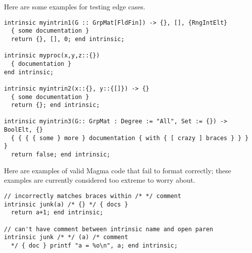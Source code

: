 \documentclass{article}
\begin{document}
Here are some examples for testing edge cases.

\begin{verbatim}
intrinsic myintrin1(G :: GrpMat[FldFin]) -> {}, [], {RngIntElt}
  { some documentation }
  return {}, [], 0; end intrinsic;

intrinsic myproc(x,y,z::{})
  { documentation }
end intrinsic;

intrinsic myintrin2(x::{}, y::{[]}) -> {}
  { some documentation }
  return {}; end intrinsic;

intrinsic myintrin3(G:: GrpMat : Degree := "All", Set := {}) -> BoolElt, {}
  { { { { some } more } documentation { with { [ crazy ] braces } } } }
  return false; end intrinsic;
\end{verbatim}

Here are examples of valid Magma code that fail to format correctly;
these examples are currently considered too extreme to worry about.

\begin{verbatim}
// incorrectly matches braces within /* */ comment
intrinsic junk(a) /* {} */ { docs }
  return a+1; end intrinsic;

// can't have comment between intrinsic name and open paren
intrinsic junk /* */ (a) /* comment
  */ { doc } printf "a = %o\n", a; end intrinsic;
\end{verbatim}
\end{document}
